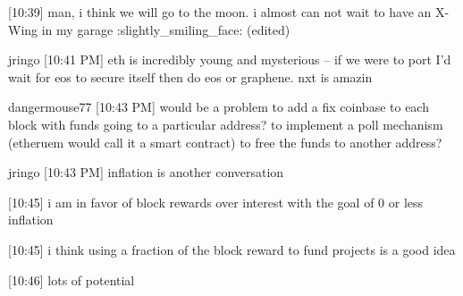 {[10:39] 
man, i think we will go to the moon. i almost can not wait to have an X-Wing in my garage :slightly_smiling_face: (edited)


jringo [10:41 PM] 
eth is incredibly young and mysterious -- if we were to port I'd wait for eos to secure itself then do eos or graphene.  nxt is amazin


dangermouse77 [10:43 PM] 
would be a problem to add a fix coinbase to each block with funds going to a particular address? to implement a poll mechanism (etheruem would call it a smart contract) to free the funds to another address?


jringo [10:43 PM] 
inflation is another conversation


[10:45] 
i am in favor of block rewards over interest with the goal of 0 or less inflation


[10:45] 
i think using a fraction of the block reward to fund projects is a good idea


[10:46] 
lots of potential
}
